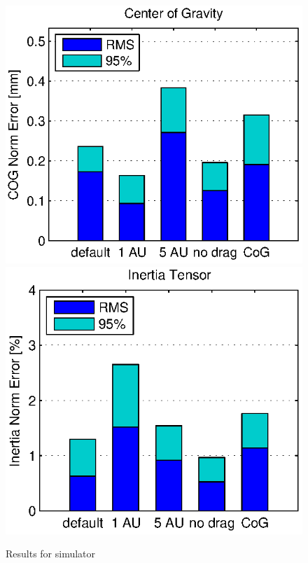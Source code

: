 \begin{figure}[hbtp]
\includegraphics[scale=.72]{images/results/err_cmp_sim_cog.eps}
\includegraphics[scale=.72]{images/results/err_cmp_sim_tensor.eps}
\caption{Results for simulator}
\label{fig:err_cmp_sim}
\end{figure}

